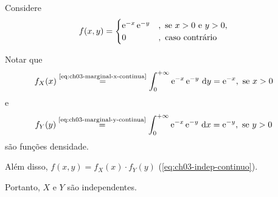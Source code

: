 \begin{example}
    Considere
    \begin{align*}
        f(x, y) &= \begin{cases}
            \operatorname{e}^{-x}\operatorname{e}^{-y} &,\ \text{se } x > 0 \text{ e } y > 0, \\
            0 &,\ \text{caso contrário}
        \end{cases}
    \end{align*}

    Notar que
    \begin{align*}
        f_X(x) 
        &\overset{\text{\Cref{eq:ch03-marginal-x-continua}}}{=}
        \int_0^{+\infty} \e^{-x} \e^{-y} \wrt y = \e^{-x}
        ,\ \text{se } x > 0
    \end{align*}
    e
    \begin{align*}
        f_Y(y)
        &\overset{\text{\Cref{eq:ch03-marginal-y-continua}}}{=}
        \int_0^{+\infty} \e^{-x} \e^{-y} \wrt x = \e^{-y}
        ,\ \text{se } y > 0
    \end{align*}
    são funções densidade. 
    
    Além disso, $f(x, y) = f_X(x) \cdot f_Y(y)$
    (\cref{eq:ch03-indep-continuo}).
    
    Portanto, $X$ e $Y$ são independentes.
\end{example}

